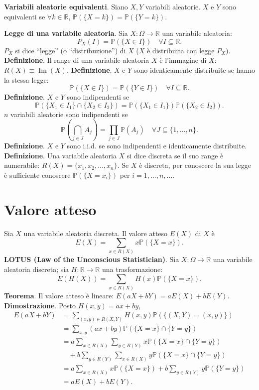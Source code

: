 \documentclass[11pt,a4paper]{article}
\newcommand{\pagina}[1]{\clearpage}
\begin{document}
\textbf{Variabili aleatorie equivalenti}. Siano $X,Y$ variabili aleatorie. $X$ e $Y$ sono equivalenti se $\forall k\in\mathbb R$, $\mathbb P(\{X=k\})=\mathbb P(\{Y=k\})$.

\textbf{Legge di una variabile aleatoria}. Sia $X:\Omega\to\mathbb R$ una variabile aleatoria:
\[P_X(I)=\mathbb P(\{X\in I\})\quad\forall I\subseteq\mathbb R.\]
$P_X$ si dice ``legge'' (o ``distribuzione'') di $X$ ($X$ è distribuita con legge $P_X$).
\pagina{19}\textbf{Definizione}. Il range di una variabile aleatoria $X$ è l'immagine di $X$: $R(X)\equiv\operatorname{Im}(X)$.
\textbf{Definizione}. $X$ e $Y$ sono identicamente distribuite se hanno la stessa legge:
\[\mathbb P(\{X\in I\})=\mathbb P(\{Y\in I\})\quad\forall I\subseteq\mathbb R.\]
\textbf{Definizione}. $X$ e $Y$ sono indipendenti se
\[\mathbb P(\{X_1\in I_1\}\cap\{X_2\in I_2\})=\mathbb P(\{X_1\in I_1\})\mathbb P(\{X_2\in I_2\}).\]
$n$ variabili aleatorie sono indipendenti se
\[\mathbb P\left(\bigcap_{j\in J}A_j\right)=\prod_{j\in J}\mathbb P(A_j)\quad\forall J\subseteq\{1,\ldots,n\}.\]
\textbf{Definizione}. $X$ e $Y$ sono i.i.d. se sono indipendenti e identicamente distribuite.
\textbf{Definizione}. Una variabile aleatoria $X$ si dice discreta se il suo range è numerabile: $R(X)=\{x_1,x_2,\ldots,x_n\}$.
Se $X$ è discreta, per conoscere la sua legge è sufficiente conoscere $\mathbb P(\{X=x_i\})$ per $i=1,\ldots,n,\ldots$.
\section*{Valore atteso}
Sia $X$ una variabile aleatoria discreta. Il valore atteso $E(X)$ di $X$ è
\[\boxed{E(X)=\sum_{x\in R(X)}x\mathbb P(\{X=x\})}.\]
\pagina{20}\textbf{LOTUS (Law of the Unconscious Statistician)}.
Sia $X:\Omega\to\mathbb R$ una variabile aleatoria discreta; sia $H:\mathbb R\to\mathbb R$ una trasformazione:
\[\boxed{E(H(X))=\sum_{x\in R(X)}H(x)\mathbb P(\{X=x\})}.\]
\textbf{Teorema}. Il valore atteso è lineare: $E(aX+bY)=aE(X)+bE(Y)$.
\textbf{Dimostrazione}. Posto $H(x,y)=ax+by$,
\begin{align*}
E(aX+bY)&=\sum_{(x,y)\in R(X,Y)}H(x,y)\mathbb P(\{(X,Y)=(x,y)\})\\
&=\sum_{x,y}(ax+by)\mathbb P(\{X=x\}\cap\{Y=y\})\\
&=a\sum_{x\in R(X)}\sum_{y\in R(Y)}x\mathbb P(\{X=x\}\cap\{Y=y\})\\
&\quad+b\sum_{y\in R(Y)}\sum_{x\in R(X)}y\mathbb P(\{X=x\}\cap\{Y=y\})\\
&=a\sum_{x\in R(X)}x\mathbb P(\{X=x\})+b\sum_{y\in R(Y)}y\mathbb P(\{Y=y\})\\
&=aE(X)+bE(Y).
\end{align*}
\end{document}
